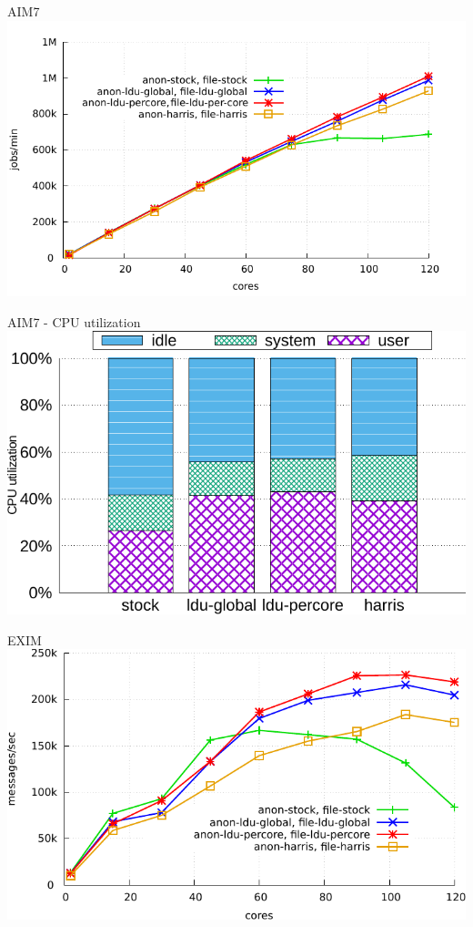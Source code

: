 \documentclass[english]{beamer} %
\begin{document}
\begin{frame}{AIM7}
\includegraphics[scale=0.8]{graph/aim7_2}
\end{frame}


\begin{frame}{AIM7 - CPU utilization}
\includegraphics[scale=0.8]{graph/aim7_cpuutils}
\end{frame}

\begin{frame}{EXIM}
\includegraphics[scale=0.8]{graph/exim}
\end{frame}
\end{document}
